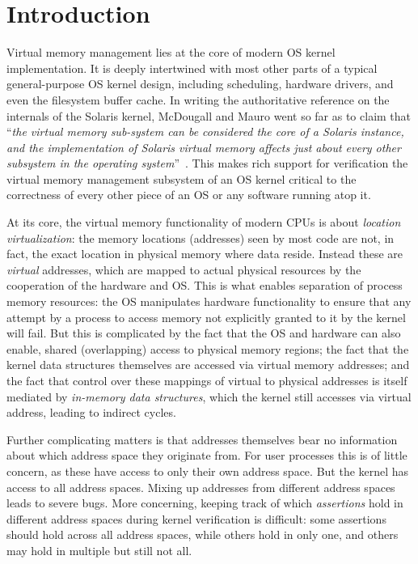 \section{Introduction}
\label{sec:intro}
Virtual memory management lies at the core of modern OS kernel implementation. It is deeply intertwined with most other parts of a typical general-purpose OS kernel design, including scheduling, hardware drivers, and even the filesystem buffer cache. In writing the authoritative reference on the internals of the Solaris kernel, McDougall and Mauro went so far as to claim that ``\emph{the virtual memory sub-system can be considered the core of a Solaris instance, and the implementation of Solaris virtual memory affects just about every other subsystem in the operating system}''~\cite{mcdougall2006solaris}.
This makes rich support for verification the virtual memory management subsystem of an OS kernel critical to the correctness of every other piece of an OS or any software running atop it.

At its core, the virtual memory functionality of modern CPUs is about \emph{location virtualization}: the memory locations (addresses) seen by most code are not, in fact, the exact location in physical memory where data reside. Instead these are \emph{virtual} addresses, which are mapped to actual physical resources by the cooperation of the hardware and OS. This is what enables separation of process memory resources:
the OS manipulates hardware functionality to ensure that any attempt by a process to access memory not explicitly granted to it by the kernel will fail.
But this is complicated by the fact that the OS and hardware can also enable, shared (overlapping) access to physical memory regions; the fact that the kernel data structures themselves are accessed via virtual memory addresses; and the fact that control over these mappings of virtual to physical addresses is itself mediated by \emph{in-memory data structures}, which the kernel still accesses via virtual address, leading to indirect cycles.

Further complicating matters is that addresses themselves bear no information about which address space they originate from. For user processes this is of little concern, as these have access to only their own address space. But the kernel has access to all address spaces. Mixing up addresses from different address spaces leads to severe bugs. More concerning, keeping track of which \emph{assertions} hold in different address spaces during kernel verification is difficult: some assertions should hold across all address spaces, while others hold in only one, and others may hold in multiple but still not all.

